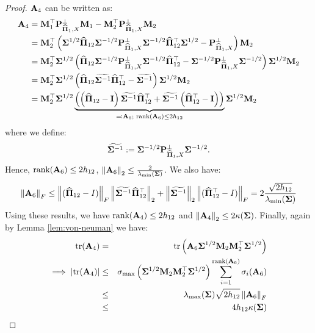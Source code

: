 \documentclass[numsec,webpdf,modern,medium,namedate]{oup-authoring-template}
\theoremstyle{thmstyleone}%
\theoremstyle{thmstyletwo}%
\theoremstyle{thmstylethree}%
\begin{document}
\begin{proof}
$\bA_4$ can be written as: 
\begin{align}
\bA_4 &= \bM_1^\top \bP_{\hatPi_1, X}^\perp \bM_1 - \bM_2^\top \bP_{\hatPi_1, X}^\perp \bM_2 \notag \\
&= \bM_2^\top \left( \bSig^{1/2} \hatPi_{12} \bSig^{-1/2} \bP_{\hatPi_1, X}^\perp \bSig^{-1/2} \hatPi_{12}^\top \bSig^{1/2} - \bP_{\hatPi_1, X}^\perp \right) \bM_2 \notag \\
&= \bM_2^\top \bSig^{1/2} \left( \hatPi_{12} \bSig^{-1/2} \bP_{\hatPi_1, X}^\perp \bSig^{-1/2} \hatPi_{12}^\top - \bSig^{-1/2} \bP_{\hatPi_1, X}^\perp \bSig^{-1/2} \right) \bSig^{1/2} \bM_2 \notag\\
&= \bM_2^\top \bSigma^{1/2} \left( \hatPi_{12} \widetilde{\bSigma^{-1}} \hatPi_{12}^\top - \widetilde{\bSigma^{-1}} \right)\bSigma^{1/2} \bM_2 \notag\\
& = \bM_2^\top \bSigma^{1/2} \underbrace{\left( \left(\hatPi_{12} - \bI\right) \widetilde{\bSig^{-1}}  \hatPi_{12}^\top + \widetilde{\bSig^{-1}} \left(\hatPi_{12}^\top - \bI\right) \right)}_{\eqqcolon \bA_6;\textrm{ rank}(\bA_6)\leq 2h_{12}} \bSig^{1/2} \bM_2 \notag
\end{align}
where we define:
\begin{equation}
\widetilde{\bSigma^{-1}} := \bSig^{-1/2} \bP_{\hatPi_1, X}^\perp \bSig^{-1/2}.
\end{equation}
Hence, $\textrm{rank}(\bA_6) \leq 2h_{12}$, $\norm{\bA_6}_2 \leq \frac{2}{\lambda_{\min}(\bSigma)}$. We also have:
$$\norm{\bA_6}_F \leq \norm{(\hatPi_{12} - I)}_F \norm{\widetilde{\bSigma^{-1}}  \hatPi_{12}^\top}_2 + \norm{\widetilde{\bSigma^{-1}}}_2 \norm{(\hatPi_{12}^\top - I)}_F= 2\frac{\sqrt{2h_{12}}}{\lambda_{\min}(\bSigma)}$$
Using these results, we have $\textrm{rank}(\bA_4) \leq 2h_{12}$ and $\norm{\bA_4}_2 \leq 2\kappa(\bSigma)$.  
Finally, again by Lemma \ref{lem:von-neuman} we have:
\begin{eqnarray*}
    \tr(\bA_4)& = &\tr\left(\bA_6 \bSig^{1/2} \bM_2 \bM_2^\top \bSig^{1/2}\right)\\
    \implies |\tr(\bA_4)| & \leq & \sigma_{\max}\left({\bSig^{1/2} \bM_2 \bM_2^\top \bSigma^{1/2}}\right)\sum_{i=1}^{\textrm{rank}(\bA_6)}\sigma_i(\bA_6) \\
    & \leq & \lambda_{\max}({\bSigma})\sqrt{2h_{12}} \norm{\bA_6}_F \\
    & \leq & 4h_{12} \kappa(\bSigma)
\end{eqnarray*}
\newpage



\end{proof}
\end{document}
